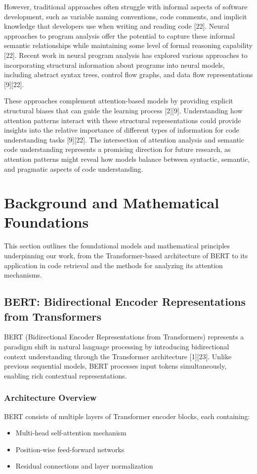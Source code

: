 \documentclass[conference]{IEEEtran}
\begin{document}
However, traditional approaches often struggle with informal aspects of software development, such as variable naming conventions, code comments, and implicit knowledge that developers use when writing and reading code [22]. Neural approaches to program analysis offer the potential to capture these informal semantic relationships while maintaining some level of formal reasoning capability [22]. Recent work in neural program analysis has explored various approaches to incorporating structural information about programs into neural models, including abstract syntax trees, control flow graphs, and data flow representations [9][22].

These approaches complement attention-based models by providing explicit structural biases that can guide the learning process [2][9]. Understanding how attention patterns interact with these structural representations could provide insights into the relative importance of different types of information for code understanding tasks [9][22]. The intersection of attention analysis and semantic code understanding represents a promising direction for future research, as attention patterns might reveal how models balance between syntactic, semantic, and pragmatic aspects of code understanding.


\section{Background and Mathematical Foundations}
\label{sec:background}

This section outlines the foundational models and mathematical principles underpinning our work, from the Transformer-based architecture of BERT to its application in code retrieval and the methods for analyzing its attention mechanisms.

\subsection{BERT: Bidirectional Encoder Representations from Transformers}
\label{ssec:bert}

BERT (Bidirectional Encoder Representations from Transformers) represents a paradigm shift in natural language processing by introducing bidirectional context understanding through the Transformer architecture [1][23]. Unlike previous sequential models, BERT processes input tokens simultaneously, enabling rich contextual representations.

\subsubsection{Architecture Overview}
BERT consists of multiple layers of Transformer encoder blocks, each containing:
\begin{itemize}
    \item Multi-head self-attention mechanism
    \item Position-wise feed-forward networks
    \item Residual connections and layer normalization
\end{itemize}
\end{document}
